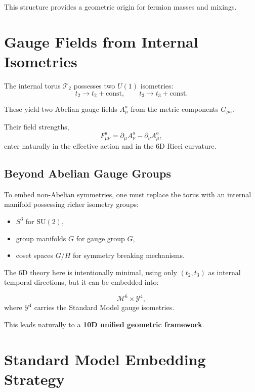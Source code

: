\documentclass[12pt]{article}
\begin{document}
This structure provides a geometric origin for fermion masses and mixings.


\newpage
\section{Gauge Fields from Internal Isometries}

The internal torus \(\mathcal{T}_2\) possesses two \(U(1)\) isometries:
\[
t_2 \to t_2 + \mathrm{const}, \qquad
t_3 \to t_3 + \mathrm{const}.
\]

These yield two Abelian gauge fields \(A^a_\mu\) from the metric components
\(G_{\mu a}\).

Their field strengths,
\[
F^a_{\mu\nu} = \partial_\mu A^a_\nu - \partial_\nu A^a_\mu,
\]
enter naturally in the effective action and in the 6D Ricci curvature.


\subsection{Beyond Abelian Gauge Groups}

To embed non-Abelian symmetries, one must replace the torus with an internal
manifold possessing richer isometry groups:

\begin{itemize}
\item \(S^3\) for \(\mathrm{SU}(2)\),
\item group manifolds \(G\) for gauge group \(G\),
\item coset spaces \(G/H\) for symmetry breaking mechanisms.
\end{itemize}

The 6D theory here is intentionally minimal, using only \((t_2,t_3)\) as
internal temporal directions, but it can be embedded into:

\[
\mathcal{M}^{6} \times \mathcal{Y}^{4},
\]
where \(\mathcal{Y}^4\) carries the Standard Model gauge isometries.

This leads naturally to a \textbf{10D unified geometric framework}.


\newpage
\section{Standard Model Embedding Strategy}
\end{document}
